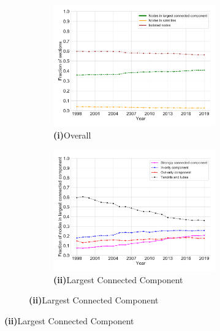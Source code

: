 \documentclass[varwidth, border=0pt]{standalone}
\begin{document}
\begin{figure}
\vspace*{6pt}

\begin{subfigure}{\linewidth}
	\begin{multicols}{2}
		\centering
		\begin{subfigure}{\linewidth}
			\includegraphics[width=\linewidth]{../../graphics/connectivity-development-statutes-only-de.pdf}
			\caption*{\textbf{\textsf{(i)}}\quad Overall}
		\end{subfigure}
		\newpage
		\begin{subfigure}{\linewidth}
			\includegraphics[width=\linewidth]{../../graphics/connectivity-lcc-statutes-only-de.pdf}
			\caption*{\textbf{\textsf{(ii)}}\quad Largest Connected Component}
		\end{subfigure}	
	\end{multicols}
	\vspace*{-6pt}
\end{subfigure}
	\end{figure}
	
\end{document}
